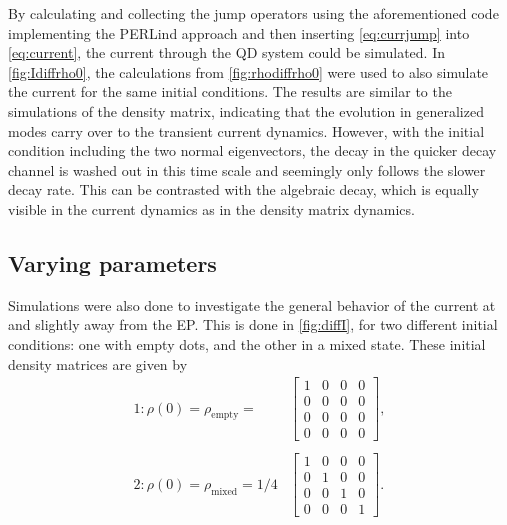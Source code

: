 \documentclass[../main.tex]{subfiles}
\begin{document}
By calculating and collecting the jump operators using the aforementioned code implementing the PERLind approach and then inserting \cref{eq:currjump} into \cref{eq:current}, the current through the QD system could be simulated. In \cref{fig:Idiffrho0}, the calculations from \cref{fig:rhodiffrho0} were used to also simulate the current for the same initial conditions. The results are similar to the simulations of the density matrix, indicating that the evolution in generalized modes carry over to the transient current dynamics. However, with the initial condition including the two normal eigenvectors, the decay in the quicker decay channel is washed out in this time scale and seemingly only follows the slower decay rate. This can be contrasted with the algebraic decay, which is equally visible in the current dynamics as in the density matrix dynamics.


\subsection{Varying parameters}

Simulations were also done to investigate the general behavior of the current at and slightly away from the EP. This is done in \cref{fig:diffI}, for two different initial conditions: one with empty dots, and the other in a mixed state. These initial density matrices are given by
\begin{equation}\label{eq:initialI}
\begin{split}
    1: \rho(0) = \rho_\text{empty} = &\begin{bmatrix} 1 & 0 & 0 & 0 \\
                                             0 & 0 & 0 & 0 \\
                                             0 & 0 & 0 & 0 \\
                                         0 & 0 & 0 & 0 \end{bmatrix},\\ \\
        2: \rho(0) = \rho_\text{mixed} = 1/4 &\begin{bmatrix} 1 & 0 & 0 & 0 \\
                                             0 & 1 & 0 & 0 \\
                                             0 & 0 & 1 & 0 \\
                                            0 & 0 & 0 & 1 \end{bmatrix}.
\end{split}
\end{equation}
\end{document}
